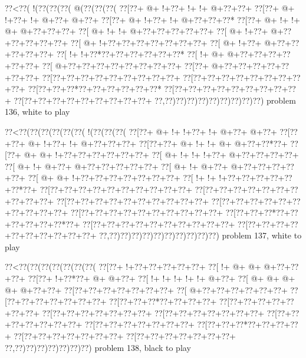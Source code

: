 \vbox{\vbox{\goo
\0??<\0??(\- !(\0??(\0??(\0??(\- @(\0??(\0??(\0??(
\0??[\0??+\- @+\- !+\0??+\- !+\- !+\- @+\0??+\0??+
\0??[\0??+\- @+\- !+\0??+\- !+\- @+\0??+\- @+\0??+
\0??[\0??+\- @+\- !+\0??+\- !+\- @+\0??+\0??+\0??*
\0??[\0??+\- @+\- !+\- !+\- @+\- @+\0??+\0??+\0??+
\0??[\- @+\- !+\- !+\- @+\0??+\0??+\0??+\0??+\0??+
\0??[\- @+\- !+\0??+\- @+\0??+\0??+\0??+\0??+\0??+
\0??[\- @+\- !+\0??+\0??+\0??+\0??+\0??+\0??+\0??+
\0??[\- @+\- !+\0??+\- @+\0??+\0??+\0??+\0??+\0??+
\0??[\- !+\- !+\0??*\0??+\0??+\0??+\0??+\0??+\0??*
\0??[\- !+\- @+\- @+\0??+\0??+\0??+\0??+\0??+\0??+
\0??[\- @+\0??+\0??+\0??+\0??+\0??+\0??+\0??+\0??+
\0??[\0??+\- @+\0??+\0??+\0??+\0??+\0??+\0??+\0??+
\0??[\0??+\0??+\0??+\0??+\0??+\0??+\0??+\0??+\0??+
\0??[\0??+\0??+\0??+\0??+\0??+\0??+\0??+\0??+\0??+
\0??[\0??+\0??+\0??*\0??+\0??+\0??+\0??+\0??+\0??*
\0??[\0??+\0??+\0??+\0??+\0??+\0??+\0??+\0??+\0??+
\0??[\0??+\0??+\0??+\0??+\0??+\0??+\0??+\0??+\0??+
\0??,\0??)\0??)\0??)\0??)\0??)\0??)\0??)\0??)\0??)
}
\hfil problem 136, white to play\hfil\break
}

\vbox{\vbox{\goo
\0??<\0??(\0??(\0??(\0??(\0??(\0??(\- !(\0??(\0??(\0??(
\0??[\0??+\- @+\- !+\- !+\0??+\- !+\- @+\0??+\- @+\0??+
\0??[\0??+\0??+\- @+\- !+\0??+\- !+\- @+\0??+\0??+\0??+
\0??[\0??+\0??+\- @+\- !+\- !+\- @+\- @+\0??+\0??*\0??+
\0??[\0??+\- @+\- @+\- !+\0??+\0??+\0??+\0??+\0??+\0??+
\0??[\- @+\- !+\- !+\- !+\0??+\- @+\0??+\0??+\0??+\0??+
\0??[\- @+\- !+\- @+\0??+\- @+\0??+\0??+\0??+\0??+\0??+
\0??[\- @+\- !+\- @+\0??+\- @+\0??+\0??+\0??+\0??+\0??+
\0??[\- @+\- @+\- !+\0??+\0??+\0??+\0??+\0??+\0??+\0??+
\0??[\- !+\- !+\- !+\0??+\0??+\0??+\0??+\0??+\0??*\0??+
\0??[\0??+\0??+\0??+\0??+\0??+\0??+\0??+\0??+\0??+\0??+
\0??[\0??+\0??+\0??+\0??+\0??+\0??+\0??+\0??+\0??+\0??+
\0??[\0??+\0??+\0??+\0??+\0??+\0??+\0??+\0??+\0??+\0??+
\0??[\0??+\0??+\0??+\0??+\0??+\0??+\0??+\0??+\0??+\0??+
\0??[\0??+\0??+\0??+\0??+\0??+\0??+\0??+\0??+\0??+\0??+
\0??[\0??+\0??+\0??*\0??+\0??+\0??+\0??+\0??+\0??*\0??+
\0??[\0??+\0??+\0??+\0??+\0??+\0??+\0??+\0??+\0??+\0??+
\0??[\0??+\0??+\0??+\0??+\0??+\0??+\0??+\0??+\0??+\0??+
\0??,\0??)\0??)\0??)\0??)\0??)\0??)\0??)\0??)\0??)\0??)
}
\hfil problem 137, white to play\hfil\break
}

\vbox{\vbox{\goo
\0??<\0??(\0??(\0??(\0??(\0??(\0??(\0??(
\0??[\0??+\- !+\0??+\0??+\0??+\0??+\0??+
\0??[\- !+\- @+\- @+\- @+\0??+\0??+\0??+
\0??[\0??+\- !+\0??*\0??+\- @+\- @+\0??+
\0??[\- !+\- !+\- !+\- !+\- !+\- @+\0??+
\0??[\- @+\- @+\- @+\- @+\- @+\0??+\0??+
\0??[\0??+\0??+\0??+\0??+\0??+\0??+\0??+
\0??[\- @+\0??+\0??+\0??+\0??+\0??+\0??+
\0??[\0??+\0??+\0??+\0??+\0??+\0??+\0??+
\0??[\0??+\0??+\0??*\0??+\0??+\0??+\0??+
\0??[\0??+\0??+\0??+\0??+\0??+\0??+\0??+
\0??[\0??+\0??+\0??+\0??+\0??+\0??+\0??+
\0??[\0??+\0??+\0??+\0??+\0??+\0??+\0??+
\0??[\0??+\0??+\0??+\0??+\0??+\0??+\0??+
\0??[\0??+\0??+\0??+\0??+\0??+\0??+\0??+
\0??[\0??+\0??+\0??*\0??+\0??+\0??+\0??+
\0??[\0??+\0??+\0??+\0??+\0??+\0??+\0??+
\0??[\0??+\0??+\0??+\0??+\0??+\0??+\0??+
\0??,\0??)\0??)\0??)\0??)\0??)\0??)\0??)
}
\hfil problem 138, black to play\hfil\break
}

